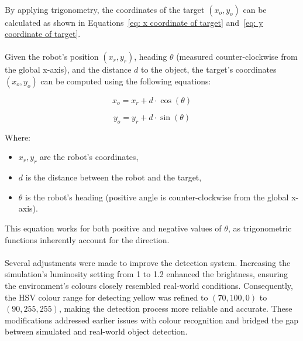 \paragraph*{}
By applying trigonometry, the coordinates of the target \((x_o, y_o)\) can be calculated as shown in Equations~\ref{eq: x coordinate of target} and~\ref{eq: y coordinate of target}.

\paragraph*{}
Given the robot’s position \((x_r, y_r)\), heading \(\theta\) (measured counter-clockwise from the global x-axis), and the distance \(d\) to the object, the target’s coordinates \((x_o, y_o)\) can be computed using the following equations:

\begin{equation}
x_o = x_r + d \cdot \cos(\theta)
\label{eq: x coordinate of target}
\end{equation}

\begin{equation}
y_o = y_r + d \cdot \sin(\theta)
\label{eq: y coordinate of target}
\end{equation}

Where:
\begin{itemize}
    \item \(x_r, y_r\) are the robot's coordinates,
    \item \(d\) is the distance between the robot and the target,
    \item \(\theta\) is the robot's heading (positive angle is counter-clockwise from the global x-axis).
\end{itemize}
This equation works for both positive and negative values of \(\theta\), as trigonometric functions inherently account for the direction.

\paragraph*{}
Several adjustments were made to improve the detection system. Increasing the simulation's luminosity setting from 1 to 1.2 enhanced the brightness, ensuring the environment's colours closely resembled real-world conditions. Consequently, the HSV colour range for detecting yellow was refined to \((70, 100, 0)\) to \((90, 255, 255)\), making the detection process more reliable and accurate. These modifications addressed earlier issues with colour recognition and bridged the gap between simulated and real-world object detection.

